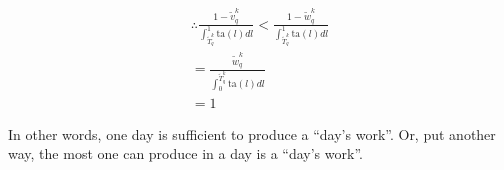 \documentclass[hidelinks, nonatbib]{elsarticle}
\begin{document}
\begin{enumerate}
\begin{align}
            \therefore
            \frac{
                1 - \tilde{v}_{q}^{k}
            }{
                \int_{\tilde{T}_{q}^{k}}^{1}{
                    \text{ta}(l)dl
                }
            } 
            < 
            \frac{
                1 - \tilde{w}_{q}^{k}
            }{
                \int_{\tilde{T}_{q}^{k}}^{1}{
                    \text{ta}(l)dl
                }
            }
            \\
            =
            \frac{
                \tilde{w}_{q}^{k}
            }{
                \int_{0}^{\tilde{T}_{q}^{k}}{
                    \text{ta}(l)dl
                }
            }
            \\
            = 1
        \end{align}

        In other words, one day is sufficient to produce a ``day's work''. Or, put another way, the most one can produce in a day is a ``day's work''.

\end{enumerate}
\end{document}
